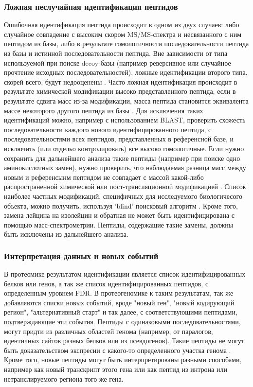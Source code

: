 \subsubsection{Ложная неслучайная идентификация пептидов}
Ошибочная идентификация пептида происходит в одном из двух случаев: либо случайное совпадение с высоким скором MS/MS-спектра и несвязанного с ним пептидом из базы, либо в результате гомологичности последовательности пептида из базы и истинной последовательности пептида. Вне зависимости от типа используемой при поиске decoy-базы (например реверсивное или случайное прочтение исходных последовательностей), ложные идентификации второго типа, скорей всего, будут недооценены \cite{nesvizhskii2010survey}. Часто ложная идентификация происходит в результате химической модификации высоко представленного пептида, если в результате сдвига масс из-за модификации, масса пептида становится эквивалента массе некоторого другого пептида из базы \cite{nesvizhskii2006dynamic, abraham2013moving}. Для исключения таких идентификаций можно, например с использованием BLAST, проверить схожесть последовательности каждого нового идентифицированного пептида, с последовательностями всех пептидов, представленных в референсной базе, и исключить (или отдельо контролировать) все высоко гомологичные. Если нужно сохранить для дальнейшего анализа такие пептиды (например при поиске одно аминокислотных замен), нужно проверить, что наблюдаемая разница масс между новым и референсынм пептидом не совпадает с массой какой-либо распространенной химической или пост-трансляционной модификацией \cite{li2011bioinformatics}. Список наиболее частных модификаций, специфичных для исследуемого биологичесого объекта, можно получить, используя 'blind' поисковый алгоритм \cite{tsur2005identification}. Кроме того, замена лейцина на изолейцин и обратная не может быть идентифицирована с помощью масс-спектрометрии. Пептиды, содержащие такие замены, должны быть исключены из дальнейшего анализа.

\subsubsection{Интерпретация данных и новых событий}
В протеомике результатом идентификации является список идентифицированных белков или генов, а так же список идентифицированных пептидов, с определенным уровнем FDR. В протеогеномике к таким результатам, так же добавляются списки новых событий, вроде "новый ген", "новый кодирующий регион", "альтернативный старт" и так далее, с соответствующими пептидами, подтверждающие эти события. Пептиды с одинаковыми последовательностями, могут придти из различных областей генома (например, от паралогов, идентичных сайтов разных белков или из псевдогенов). Такие пептиды не могут быть доказательством экспресии с какого-то определенного участка генома \cite{nesvizhskii2005interpretation}. Кроме того, новые пептиды могут быть интерпретированы разными способами, например как новый транскрипт этого гена или как пептид из интрона или нетранслируемого региона того же гена. 


